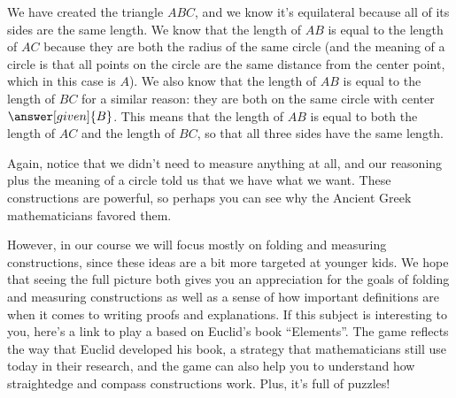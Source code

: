 \documentclass{ximera}
\begin{document}
\begin{example}
\begin{image}
\end{image}
We have created the triangle $ABC$, and we know it's equilateral because all of its sides are the same length. We know that the length of $AB$ is equal to the length of $AC$ because they are both the radius of the same circle (and the meaning of a circle is that all points on the circle are the same distance from the center point, which in this case is $A$). We also know that the length of $AB$ is equal to the length of $BC$ for a similar reason: they are both on the same circle with center $\answer[given]{B}$. This means that the length of $AB$ is equal to both the length of $AC$ and the length of $BC$, so that all three sides have the same length.
\end{example}
Again, notice that we didn't need to measure anything at all, and our reasoning plus the meaning of a circle told us that we have what we want. These constructions are powerful, so perhaps you can see why the Ancient Greek mathematicians favored them.

However, in our course we will focus mostly on folding and measuring constructions, since these ideas are a bit more targeted at younger kids. We hope that seeing the full picture both gives you an appreciation for the goals of folding and measuring constructions as well as a sense of how important definitions are when it comes to writing proofs and explanations. If this subject is interesting to you, here's a link to play a  based on Euclid's book ``Elements''. The game reflects the way that Euclid developed his book, a strategy that mathematicians still use today in their research, and the game can also help you to understand how straightedge and compass constructions work. Plus, it's full of puzzles!
\end{document}
